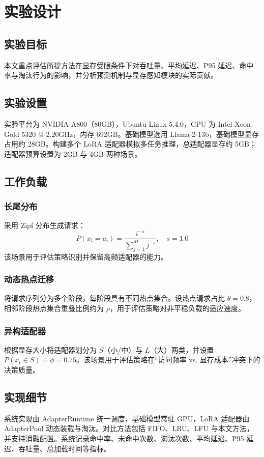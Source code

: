 \section{实验设计}
\subsection{实验目标}
本文重点评估所提方法在显存受限条件下对吞吐量、平均延迟、P95 延迟、命中率与淘汰行为的影响，并分析预测机制与显存感知模块的实际贡献。

\subsection{实验设置}
实验平台为 NVIDIA A800（80GB），Ubuntu Linux 5.4.0，CPU 为 Intel Xeon Gold 5320 @ 2.20GHz，内存 692GB。基础模型选用 Llama-2-13b，基础模型显存占用约 28GB。构建多个 LoRA 适配器模拟多任务推理，总适配器显存约 5GB；适配器预算设置为 2GB 与 4GB 两种场景。

\subsection{工作负载}
\subsubsection{长尾分布}
采用 Zipf 分布生成请求：
\begin{equation}
P(x_t=a_i)=\frac{i^{-s}}{\sum_{j=1}^M j^{-s}},\quad s=1.0
\end{equation}
该场景用于评估策略识别并保留高频适配器的能力。

\subsubsection{动态热点迁移}
将请求序列分为多个阶段，每阶段具有不同热点集合。设热点请求占比 $\theta=0.8$，相邻阶段热点集合重叠比例约为 $\rho$，用于评估策略对非平稳负载的适应速度。

\subsubsection{异构适配器}
根据显存大小将适配器划分为 $S$（小/中）与 $L$（大）两类，并设置 $P(x_t\in S)=\phi=0.75$。该场景用于评估策略在“访问频率 vs. 显存成本”冲突下的决策质量。

\subsection{实现细节}
系统实现由 AdapterRuntime 统一调度，基础模型常驻 GPU，LoRA 适配器由 AdapterPool 动态装载与淘汰。对比方法包括 FIFO、LRU、LFU 与本文方法，并支持消融配置。系统记录命中率、未命中次数、淘汰次数、平均延迟、P95 延迟、吞吐量、总加载时间等指标。

